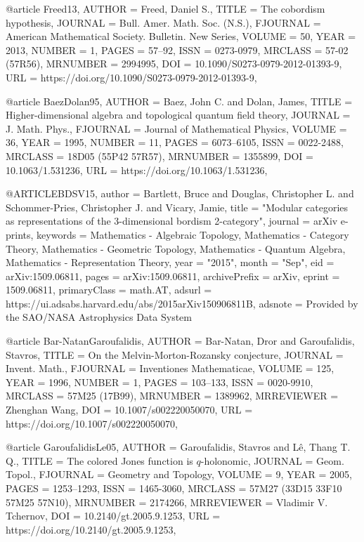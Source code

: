@article {Freed13,
    AUTHOR = {Freed, Daniel S.},
     TITLE = {The cobordism hypothesis},
   JOURNAL = {Bull. Amer. Math. Soc. (N.S.)},
  FJOURNAL = {American Mathematical Society. Bulletin. New Series},
    VOLUME = {50},
      YEAR = {2013},
    NUMBER = {1},
     PAGES = {57--92},
      ISSN = {0273-0979},
   MRCLASS = {57-02 (57R56)},
  MRNUMBER = {2994995},
       DOI = {10.1090/S0273-0979-2012-01393-9},
       URL = {https://doi.org/10.1090/S0273-0979-2012-01393-9},
}

@article {BaezDolan95,
    AUTHOR = {Baez, John C. and Dolan, James},
     TITLE = {Higher-dimensional algebra and topological quantum field
              theory},
   JOURNAL = {J. Math. Phys.},
  FJOURNAL = {Journal of Mathematical Physics},
    VOLUME = {36},
      YEAR = {1995},
    NUMBER = {11},
     PAGES = {6073--6105},
      ISSN = {0022-2488},
   MRCLASS = {18D05 (55P42 57R57)},
  MRNUMBER = {1355899},
       DOI = {10.1063/1.531236},
       URL = {https://doi.org/10.1063/1.531236},
}

@ARTICLE{BDSV15,
       author = {{Bartlett}, Bruce and {Douglas}, Christopher L. and
         {Schommer-Pries}, Christopher J. and {Vicary}, Jamie},
        title = "{Modular categories as representations of the 3-dimensional bordism 2-category}",
      journal = {arXiv e-prints},
     keywords = {Mathematics - Algebraic Topology, Mathematics - Category Theory, Mathematics - Geometric Topology, Mathematics - Quantum Algebra, Mathematics - Representation Theory},
         year = "2015",
        month = "Sep",
          eid = {arXiv:1509.06811},
        pages = {arXiv:1509.06811},
archivePrefix = {arXiv},
       eprint = {1509.06811},
 primaryClass = {math.AT},
       adsurl = {https://ui.adsabs.harvard.edu/abs/2015arXiv150906811B},
      adsnote = {Provided by the SAO/NASA Astrophysics Data System}
}

@article {Bar-NatanGaroufalidis,
    AUTHOR = {Bar-Natan, Dror and Garoufalidis, Stavros},
     TITLE = {On the {M}elvin-{M}orton-{R}ozansky conjecture},
   JOURNAL = {Invent. Math.},
  FJOURNAL = {Inventiones Mathematicae},
    VOLUME = {125},
      YEAR = {1996},
    NUMBER = {1},
     PAGES = {103--133},
      ISSN = {0020-9910},
   MRCLASS = {57M25 (17B99)},
  MRNUMBER = {1389962},
MRREVIEWER = {Zhenghan Wang},
       DOI = {10.1007/s002220050070},
       URL = {https://doi.org/10.1007/s002220050070},
}

@article {GaroufalidisLe05,
    AUTHOR = {Garoufalidis, Stavros and L\^{e}, Thang T. Q.},
     TITLE = {The colored {J}ones function is {$q$}-holonomic},
   JOURNAL = {Geom. Topol.},
  FJOURNAL = {Geometry and Topology},
    VOLUME = {9},
      YEAR = {2005},
     PAGES = {1253--1293},
      ISSN = {1465-3060},
   MRCLASS = {57M27 (33D15 33F10 57M25 57N10)},
  MRNUMBER = {2174266},
MRREVIEWER = {Vladimir V. Tchernov},
       DOI = {10.2140/gt.2005.9.1253},
       URL = {https://doi.org/10.2140/gt.2005.9.1253},
}

